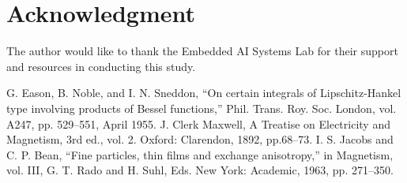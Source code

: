 \documentclass[conference]{IEEEtran}
\begin{document}
    \section*{Acknowledgment}
    The author would like to thank the Embedded AI Systems Lab for their support and resources in conducting this study.

    \begin{thebibliography}{00}
         G. Eason, B. Noble, and I. N. Sneddon, ``On certain integrals of Lipschitz-Hankel type involving products of Bessel functions,'' Phil. Trans. Roy. Soc. London, vol. A247, pp. 529--551, April 1955.
         J. Clerk Maxwell, A Treatise on Electricity and Magnetism, 3rd ed., vol. 2. Oxford: Clarendon, 1892, pp.68--73.
         I. S. Jacobs and C. P. Bean, ``Fine particles, thin films and exchange anisotropy,'' in Magnetism, vol. III, G. T. Rado and H. Suhl, Eds. New York: Academic, 1963, pp. 271--350.
    \end{thebibliography}
\end{document}
